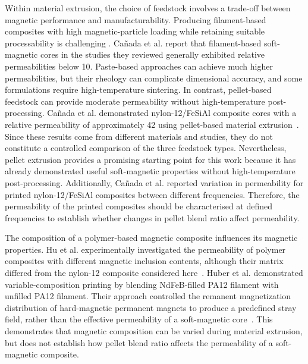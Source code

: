 Within material extrusion, the choice of feedstock involves a trade-off between magnetic performance and manufacturability. Producing filament-based composites with high magnetic-particle loading while retaining suitable processability is challenging \cite{taylorFully3DPrintedMonolithic2019}. Cañada et al. report that filament-based soft-magnetic cores in the studies they reviewed generally exhibited relative permeabilities below 10. Paste-based approaches can achieve much higher permeabilities, but their rheology can complicate dimensional accuracy, and some formulations require high-temperature sintering. In contrast, pellet-based feedstock can provide moderate permeability without high-temperature post-processing. Cañada et al. demonstrated nylon-12/FeSiAl composite cores with a relative permeability of approximately 42 using pellet-based material extrusion~\cite{canadaMagneticFluxGuides2026}. Since these results come from different materials and studies, they do not constitute a controlled comparison of the three feedstock types. Nevertheless, pellet extrusion provides a promising starting point for this work because it has already demonstrated useful soft-magnetic properties without high-temperature post-processing. Additionally, Cañada et al. reported variation in permeability for printed nylon-12/FeSiAl composites between different frequencies. Therefore, the permeability of the printed composites should be characterised at defined frequencies to establish whether changes in pellet blend ratio affect permeability.



The composition of a polymer-based magnetic composite influences its magnetic properties. Hu et al. experimentally investigated the permeability of polymer composites with different magnetic inclusion contents, although their matrix differed from the nylon-12 composite considered here~\cite{huExperimentalStudyMagnetic2022}. Huber et al. demonstrated variable-composition printing by blending NdFeB-filled PA12 filament with unfilled PA12 filament. Their approach controlled the remanent magnetization distribution of hard-magnetic permanent magnets to produce a predefined stray field, rather than the effective permeability of a soft-magnetic core~\cite{huber3DPrintingPolymerBonded2017}. This demonstrates that magnetic composition can be varied during material extrusion, but does not establish how pellet blend ratio affects the permeability of a soft-magnetic composite.


